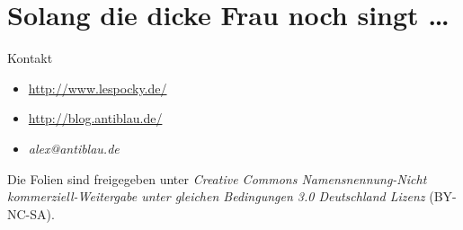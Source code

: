 \documentclass[hyperref={pdfpagelabels=false}]{beamer}
\begin{document}
\section*{Solang die dicke Frau noch singt \dots}

\begin{frame}{Kontakt}
    \begin{itemize}
        \item \url{http://www.lespocky.de/}
        \item \url{http://blog.antiblau.de/}
        \item \emph{alex@antiblau.de}
    \end{itemize}

    \vspace{1em}
    \small
    Die Folien sind freigegeben unter \emph{Creative Commons
    Namensnennung-Nicht kommerziell-Weitergabe unter gleichen
    Bedingungen 3.0 Deutschland Lizenz} (BY-NC-SA).
    \normalsize
\end{frame}
\end{document}
